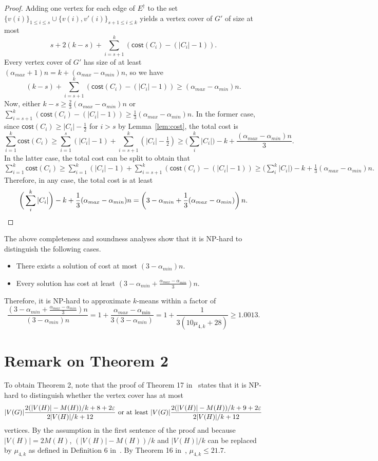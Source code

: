 \documentclass{scrartcl}
\newcommand{\cost}{\mathsf{cost}}
\begin{document}
\begin{proof}
Adding one vertex for each edge of $E^{\dagger}$ to the set $\{v(i)\}_{1 \leq i \leq s} \cup \{ v(i), v'(i) \}_{s + 1 \leq i \leq k }$ yields a vertex cover of $G'$ of size at most 
\[
s + 2(k - s) + \sum_{i = s +1}^k (\cost(C_i) - (|C_i| - 1)). 
\]
Every vertex cover of $G'$ has size of at least $(\alpha_{max} + 1)n = k + (\alpha_{max} - \alpha_{min})n$, so we have 
\[
(k - s) + \sum_{i = s +1}^k (\cost(C_i) - (|C_i| - 1)) \geq (\alpha_{max} - \alpha_{min})n. 
\]
Now, either $k - s \geq \frac{2}{3}(\alpha_{max} - \alpha_{min})n$ or $\sum_{i = s +1}^k (\cost(C_i) - (|C_i| - 1)) \geq \frac{1}{3}(\alpha_{max} - \alpha_{min})n$.
In the former case, since $\cost(C_i) \geq |C_i| - \frac{1}{2}$ for $i > s$ by Lemma~\ref{lem:cost}, the total cost is 
\[
\sum_{i=1}^k \cost(C_i) \geq \sum_{i=1}^s (|C_i| - 1) + \sum_{i=s+1}^k (|C_i| - \tfrac{1}{2}) \geq \bigg(\sum_i^k |C_i| \bigg) - k + \frac{(\alpha_{max} - \alpha_{min})n}{3}.
\]
In the latter case, the total cost can be split to obtain that  
$\sum\limits_{i=1}^k \cost(C_i) \geq \sum\limits_{i=1}^k (|C_i| - 1) + \sum\limits_{i=s+1}^k (\cost(C_i) - (|C_i| - 1))
  \geq \big(\sum\limits_i^k |C_i| \big) - k + \frac{1}{3}(\alpha_{max} - \alpha_{min})n.$
Therefore, in any case, the total cost is at least 
\[
\bigg(\sum_i^k |C_i| \bigg) - k + \frac{1}{3}(\alpha_{max} - \alpha_{min})n = \left(3 - \alpha_{min} + \frac{1}{3}(\alpha_{max} - \alpha_{min})\right)n.\qedhere
\vspace*{-\baselineskip}
\]
\end{proof}

The above completeness and soundness analyses show that it is NP-hard to distinguish the following cases.
\begin{itemize}
\item There exists a solution of cost at most $(3 - \alpha_{min})n$. 
\item Every solution has cost at least $(3 - \alpha_{min} + \frac{\alpha_{max} - \alpha_{min}}{3})n$.
\end{itemize}
Therefore, it is NP-hard to approximate $k$-means within a factor of
\[
\frac{(3 - \alpha_{min} + \frac{\alpha_{max} - \alpha_{min}}{3})n}{(3 - \alpha_{min})n} 
= 1 + \frac{\alpha_{max} - \alpha_{\min}}{3(3-\alpha_{min})}
= 1 + \frac{1}{3(10\mu_{4,k}+28)} 
\geq 1.0013.
\]




\appendix

\section{Remark on Theorem 2}\label{appendix:thm2}
To obtain Theorem 2, note that the proof of Theorem 17 in~\cite{CC06} states that it is NP-hard to distinguish whether the vertex cover has at most
\footnotesize
\[
|V(G)|\frac{2(|V(H)|-M(H))/k + 8 + 2\varepsilon}{2|V(H)|/k + 12} \text{ \normalsize or at least }
|V(G)|\frac{2(|V(H)|-M(H))/k + 9 + 2\varepsilon}{2|V(H)|/k + 12}
\]
\normalsize
vertices. By the assumption in the first sentence of the proof and because $|V(H)|=2M(H)$, $(|V(H)|-M(H))/k$ and $|V(H)|/k$ can be replaced by $\mu_{4,k}$ as defined in Definition 6 in~\cite{CC06}. By Theorem 16 in~\cite{CC06}, $\mu_{4,k} \le 21.7$.
\end{document}
